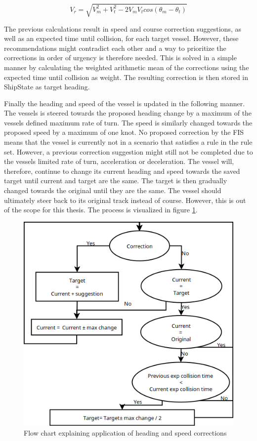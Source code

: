 \begin{equation}
    V_r=\sqrt{V_m^2 + V_t^2-2  V_mV_tcos(\theta_m-\theta_t)}
    \label{eq:rel_vel_calc}
\end{equation}

The previous calculations result in speed and course correction suggestions, as well as an expected time until collision, for each target vessel. However, these recommendations might contradict each other and a way to prioritize the corrections in order of urgency is therefore needed. This is solved in a simple manner by calculating the weighted arithmetic mean of the corrections using the expected time until collision as weight. The resulting correction is then stored in ShipState as target heading.

Finally the heading and speed of the vessel is updated in the following manner. The vessels is steered towards the proposed heading change by a maximum of the vessels defined maximum rate of turn. The speed is similarly changed towards the proposed speed by a maximum of one knot. No proposed correction by the FIS means that the vessel is currently not in a scenario that satisfies a rule in the rule set. However, a previous correction suggestion might still not be completed due to the vessels limited rate of turn, acceleration or deceleration.  The vessel will, therefore, continue to change its current heading and speed towards the saved target until current and target are the same. The target is then gradually changed towards the original until they are the same. The vessel should ultimately steer back to its original track instead of course. However, this is out of the scope for this thesis. The process is visualized in figure \ref{fig:flow_chart}.
\begin{figure}[H]
    \centering
    \includegraphics[width=\textwidth,height=0.75\textheight,keepaspectratio]{Figures/flow.png}
    \caption{Flow chart explaining application of heading and speed corrections}
    \label{fig:flow_chart}
\end{figure}

